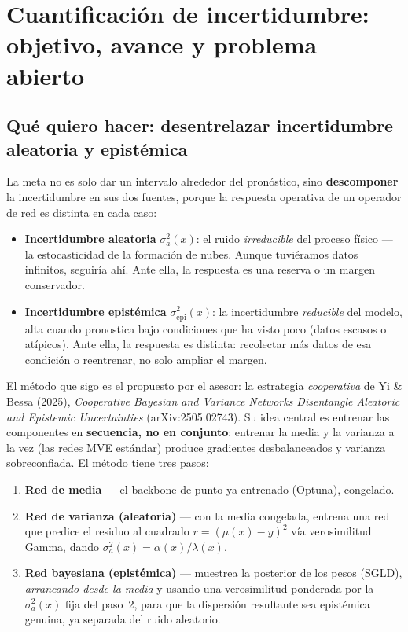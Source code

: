 \documentclass[12pt,a4paper]{article}
\begin{document}
\section{Cuantificación de incertidumbre: objetivo, avance y problema abierto}
\label{sec:sgld}

\subsection{Qué quiero hacer: desentrelazar incertidumbre aleatoria y epistémica}

La meta no es solo dar un intervalo alrededor del pronóstico, sino
\textbf{descomponer} la incertidumbre en sus dos fuentes, porque la respuesta
operativa de un operador de red es distinta en cada caso:

\begin{itemize}[leftmargin=1.5em, noitemsep]
  \item \textbf{Incertidumbre aleatoria} $\sigma_a^2(x)$: el ruido
        \emph{irreducible} del proceso físico --- la estocasticidad de la
        formación de nubes. Aunque tuviéramos datos infinitos, seguiría ahí.
        Ante ella, la respuesta es una reserva o un margen conservador.
  \item \textbf{Incertidumbre epistémica} $\sigma_\text{epi}^2(x)$: la
        incertidumbre \emph{reducible} del modelo, alta cuando pronostica
        bajo condiciones que ha visto poco (datos escasos o atípicos). Ante
        ella, la respuesta es distinta: recolectar más datos de esa condición
        o reentrenar, no solo ampliar el margen.
\end{itemize}

El método que sigo es el propuesto por el asesor: la estrategia
\emph{cooperativa} de Yi \& Bessa (2025), \emph{Cooperative Bayesian and
Variance Networks Disentangle Aleatoric and Epistemic Uncertainties}
(arXiv:2505.02743). Su idea central es entrenar las componentes en
\textbf{secuencia, no en conjunto}: entrenar la media y la varianza a la vez
(las redes MVE estándar) produce gradientes desbalanceados y varianza
sobreconfiada. El método tiene tres pasos:

\begin{enumerate}[leftmargin=1.6em, noitemsep]
  \item \textbf{Red de media} --- el backbone de punto ya entrenado (Optuna),
        congelado.
  \item \textbf{Red de varianza (aleatoria)} --- con la media congelada,
        entrena una red que predice el residuo al cuadrado
        $r=(\mu(x)-y)^2$ vía verosimilitud Gamma, dando
        $\sigma_a^2(x)=\alpha(x)/\lambda(x)$.
  \item \textbf{Red bayesiana (epistémica)} --- muestrea la posterior de los
        pesos (SGLD), \emph{arrancando desde la media} y usando una
        verosimilitud ponderada por la $\sigma_a^2(x)$ fija del paso~2, para
        que la dispersión resultante sea epistémica genuina, ya separada del
        ruido aleatorio.
\end{enumerate}
\end{document}
